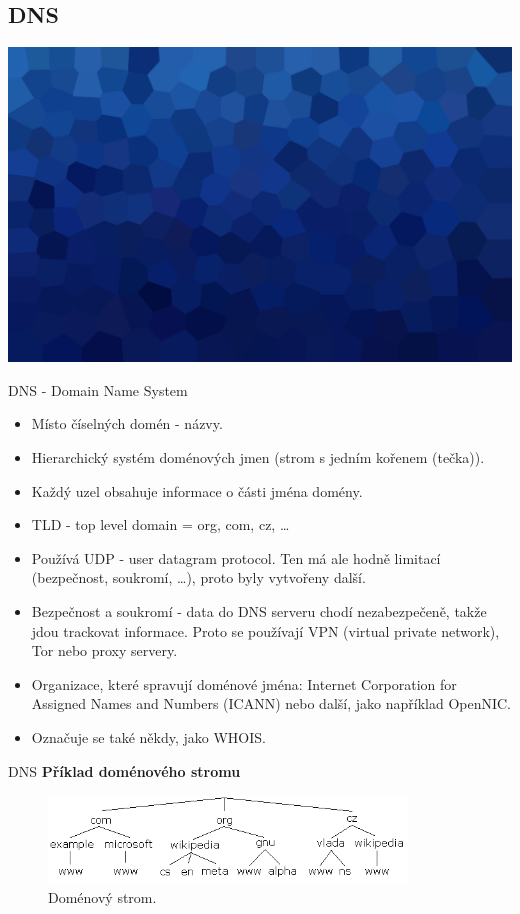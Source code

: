 \documentclass[aspectratio=169,xcolor=dvipsnames, t]{beamer}
\begin{document}
\subsection{DNS}
{
    \includegraphics[width=\paperwidth,height=\paperheight]{AICStyleData/logos/mene_polygonu_bg.png}
}
\begin{frame}{DNS - Domain Name System}
    \begin{itemize}
        \item Místo číselných domén - názvy.
        \item Hierarchický systém doménových jmen (strom s jedním kořenem (tečka)).
        \item Každý uzel obsahuje informace o části jména domény.
        \item TLD - top level domain = org, com, cz, \ldots
        \item Používá UDP - user datagram protocol. Ten má ale hodně limitací (bezpečnost, soukromí, \ldots), proto byly vytvořeny další.
        \item Bezpečnost a soukromí - data do DNS serveru chodí nezabezpečeně, takže jdou trackovat informace. Proto se používají VPN (virtual private network), Tor nebo proxy servery.
        \item Organizace, které spravují doménové jména:  Internet Corporation for Assigned Names and Numbers (ICANN) nebo další, jako například OpenNIC.
        \item Označuje se také někdy, jako WHOIS.
    \end{itemize}
\end{frame}
\begin{frame}{DNS}
    \vspace{-0.5cm}
    \textbf{\Large Příklad doménového stromu}
    \begin{figure}
        \centering
        \includegraphics[width=0.85\textwidth]{domeny}
        \caption{Doménový strom.}
    \end{figure}
\end{frame}
\end{document}

